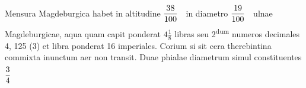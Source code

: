 \rule[0mm]{0mm}{3mm}
\pstart {} Mensura Magdeburgica  habet in altitudine $\displaystyle \frac{38}{100}\rule[-4mm]{0mm}{10mm}\hspace{5.5pt}$%
                     in diametro $\displaystyle\frac{19}{100}\rule[-4mm]{0mm}{10mm}\hspace{5.5pt}$%
                     ulnae  Magdeburgicae,  aqua quam capit ponderat $\displaystyle4\frac{1}{8}$ %
                     libras seu 2\textsuperscript{dum} numeros decimales 4, 125 (3)  et libra ponderat 16 imperiales.\pend \pstart {} Corium si sit cera  therebintina commixta inunctum aer non  transit. Duae phialae diametrum simul  constituentes $\displaystyle\frac{3}{4}\rule[-4mm]{0mm}{10mm}\hspace{5.5pt}$%

